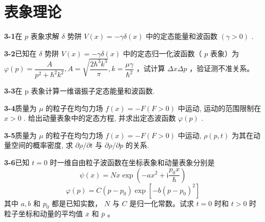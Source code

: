 \chapter{表象理论}

\newpage


\textbf{3-1}\quad 在 $\displaystyle p$ 表象求解 $\displaystyle \delta$ 势阱 $\displaystyle V(x) = -\gamma \delta (x)$ 中的定态能量和波函数 $\displaystyle (\gamma > 0)$ .

\vfill

\newpage

\textbf{3-2}\quad 已知在 $\displaystyle \delta$ 势阱 $\displaystyle V(x) = -\gamma \delta (x)$ 中的定态归一化波函数（ $\displaystyle p$ 表象）为 $\displaystyle \varphi(p) = \dfrac{A}{p^2 + \hbar^2 k^2}, A = \sqrt{\dfrac{2\hbar^3 k^3}{\pi}}, k = \dfrac{\mu\gamma}{\hbar^2}$ ，试计算 $\displaystyle \Delta x \Delta p$ ，验证测不准关系。

\vfill

\newpage

\textbf{3-3}\quad 在 p 表象计算一维谐振子定态能量和波函数.

\vfill

\newpage

\textbf{3-4}\quad 质量为 $\displaystyle \mu$ 的粒子在均匀力场 $\displaystyle f(x) = -F(F > 0)$ 中运动, 运动的范围限制在 $\displaystyle x > 0$ . 给出动量表象中的定态方程, 并求出定态波函数 $\displaystyle \varphi(p)$ .

\vfill

\newpage

\textbf{3-5}\quad 质量为 $\displaystyle \mu$ 的粒子在均匀力场 $\displaystyle f(x) = -F(F > 0)$ 中运动, $\displaystyle \rho(p, t)$ 为其在动量空间的概率密度, 求 $\displaystyle \partial \rho / \partial t$ 与 $\displaystyle \partial \rho / \partial p$ 的关系.

\vfill

\newpage

\textbf{3-6}\quad 已知 $\displaystyle t = 0$ 时一维自由粒子波函数在坐标表象和动量表象分别是
$$
\psi (x) = N x \exp \left(- a x ^ {2} + \mathrm{i} \dfrac {p _ {0} x}{\hbar}\right)
$$
$$
\varphi (p) = C \left(p - p _ {0}\right) \exp \left[ - b \left(p - p _ {0}\right) ^ {2} \right]
$$
其中 $\displaystyle a, b$ 和 $\displaystyle p_0$ 都是已知实数， $\displaystyle N$ 与 $\displaystyle C$ 是归一化常数。试求 $\displaystyle t = 0$ 时和 $\displaystyle t > 0$ 时粒子坐标和动量的平均值 $\displaystyle \overline{x}$ 和 $\displaystyle \overline{p}$ 。

\vfill

